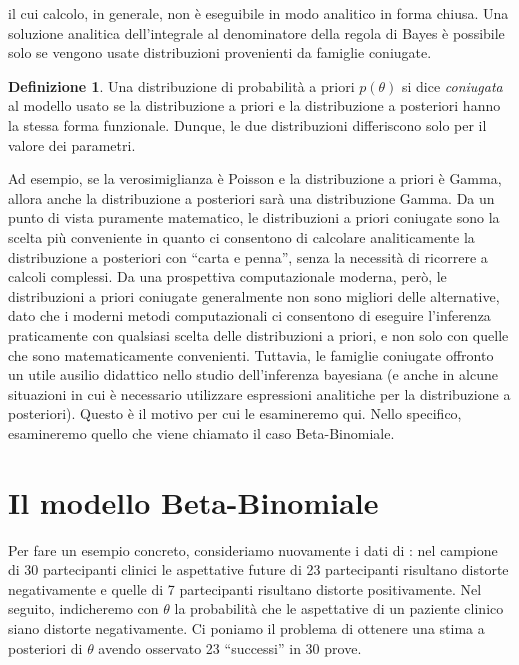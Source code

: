 \documentclass[
  11pt,
]{krantz}
\theoremstyle{definition}
\newtheorem{definition}{Definizione}[chapter]
\theoremstyle{definition}
\theoremstyle{definition}
\theoremstyle{definition}
\theoremstyle{remark}
\begin{document}
il cui calcolo, in generale, non è eseguibile in modo analitico in forma chiusa. Una soluzione analitica dell'integrale al denominatore della regola di Bayes è possibile solo se vengono usate distribuzioni provenienti da famiglie coniugate.

\begin{definition}
Una distribuzione di probabilità a priori \(p(\theta)\) si dice \emph{coniugata} al modello usato se la distribuzione a priori e la distribuzione a posteriori hanno la stessa forma funzionale. Dunque, le due distribuzioni differiscono solo per il valore dei parametri.
\end{definition}

\noindent Ad esempio, se la verosimiglianza è Poisson e la distribuzione a priori è Gamma, allora anche la distribuzione a posteriori sarà una distribuzione Gamma. Da un punto di vista puramente matematico, le distribuzioni a priori coniugate sono la scelta più conveniente in quanto ci consentono di calcolare analiticamente la distribuzione a posteriori con ``carta e penna'', senza la necessità di ricorrere a calcoli complessi. Da una prospettiva computazionale moderna, però, le distribuzioni a priori coniugate generalmente non sono migliori delle alternative, dato che i moderni metodi computazionali ci consentono di eseguire l'inferenza praticamente con qualsiasi scelta delle distribuzioni a priori, e non solo con quelle che sono matematicamente convenienti. Tuttavia, le famiglie coniugate offronto un utile ausilio didattico nello studio dell'inferenza bayesiana (e anche in alcune situazioni in cui è necessario utilizzare espressioni analitiche per la distribuzione a posteriori). Questo è il motivo per cui le esamineremo qui. Nello specifico, esamineremo quello che viene chiamato il caso Beta-Binomiale.

\hypertarget{chapter-distr-priori-coniugate}{%
\section{Il modello Beta-Binomiale}\label{chapter-distr-priori-coniugate}}

Per fare un esempio concreto, consideriamo nuovamente i dati di \citet{zetschefuture2019}: nel campione di 30 partecipanti clinici le aspettative future di 23 partecipanti risultano distorte negativamente e quelle di 7 partecipanti risultano distorte positivamente. Nel seguito, indicheremo con \(\theta\) la probabilità che le aspettative di un paziente clinico siano distorte negativamente. Ci poniamo il problema di ottenere una stima a posteriori di \(\theta\) avendo osservato 23 ``successi'' in 30 prove.
\end{document}
